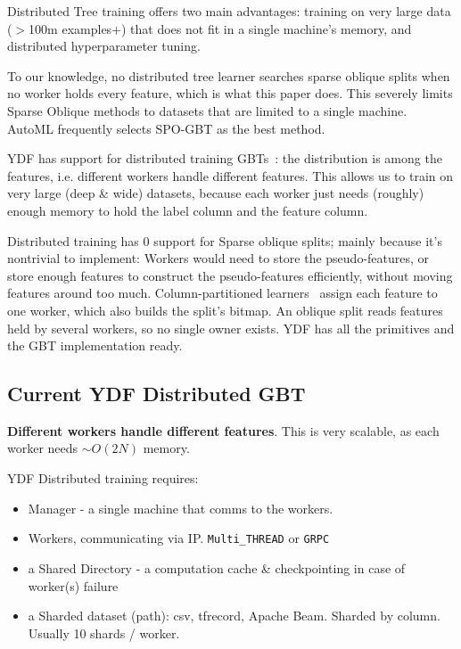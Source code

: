 \documentclass[sigconf,screen]{acmart}
\begin{document}


Distributed Tree training offers two main advantages: training on very large data ($>$100m examples+) that does not fit in a single machine's memory, and distributed hyperparameter tuning. 

To our knowledge, no distributed tree learner searches sparse oblique splits when no worker holds every feature, which is what this paper does. This severely limits Sparse Oblique methods to datasets that are limited to a single machine. AutoML frequently selects SPO-GBT as the best method.

YDF has support for distributed training GBTs~\cite{ydf,guillamebert2018exact}: the distribution is among the features, i.e. different workers handle different features. This allows us to train on very large (deep \& wide) datasets, because each worker just needs (roughly) enough memory to hold the label column and the feature column. 


Distributed training has 0 support for Sparse oblique splits; mainly because it's nontrivial to implement: Workers would need to store the pseudo-features, or store enough features to construct the pseudo-features efficiently, without moving features around too much. 
Column-partitioned learners~\cite{abuzaid2016yggdrasil,guillamebert2018exact,ydf} assign each feature to one worker, which also builds the split's bitmap. An oblique split reads features held by several workers, so no single owner exists. YDF has all the primitives and the GBT implementation ready.


\subsection{Current YDF Distributed GBT}

\textbf{Different workers handle different features}. This is very scalable, as each worker needs $\sim O(2N)$ memory.

YDF Distributed training requires:

\begin{itemize}
    \item Manager - a single machine that comms to the workers.
    \item Workers, communicating via IP. \texttt{Multi\_THREAD} or \texttt{GRPC}
    \item a Shared Directory - a computation cache \& checkpointing in case of worker(s) failure
    \item a Sharded dataset (path): csv, tfrecord, Apache Beam. Sharded by column. Usually 10 shards / worker.
\end{itemize}
\end{document}
